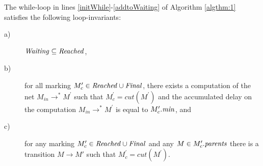 \begin{lemma}[Invariant]
	\label{lemma:invariants}
	The while-loop in lines \ref{initWhile}-\ref{addtoWaiting} of Algorithm \ref{algthm:1} satisfies the following loop-invariants:
	\begin{description}
		\item[a)] ${\mathit{Waiting}} \subseteq {\mathit{Reached}}$, 
		\item[b)] for all marking $M^\prime_c \in {\mathit{Reached}} \cup {\mathit{Final}}$, there exists a computation of the net $M_{in} \rightarrow^* M^\prime$ such that $M^\prime_c=cut(M^\prime)$ and the accumulated delay
on the computation $M_{in} \rightarrow^* M^\prime$ 
is equal to $M'_c.{\mathit{min}}$, and
		\item[c)] for any marking $M'_c \in {\mathit{Reached}} \cup {\mathit{Final}}$ and any $M \in M'_c.{\mathit{parents}}$ there is a transition 
   $M \rightarrow M'$ such that $M^\prime_c=cut(M^\prime)$.
	\end{description}
\end{lemma}

